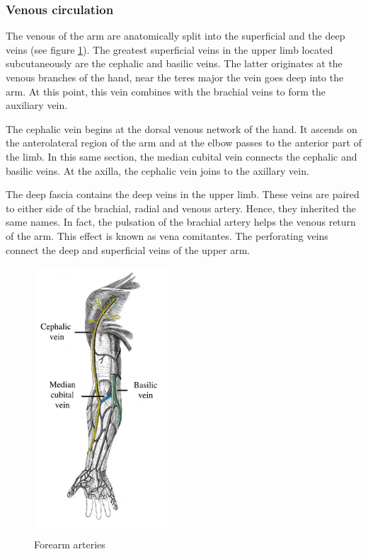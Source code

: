 \subsubsection{Venous circulation}
The venous of the arm are anatomically split into the superficial and the deep veins (see figure \ref{fig:arm veind}). The greatest superficial veins in the upper limb located subcutaneously are the cephalic and basilic veins. The latter originates at the venous branches of the hand, near the teres major the vein goes deep into the arm. At this point, this vein combines with the brachial veins to form the auxiliary vein. 

The cephalic vein begins at the dorsal venous network of the hand. It ascends on the anterolateral region of the arm and at the elbow passes to the anterior part of the limb. In this same section, the median cubital vein connects the cephalic and basilic veins. At the axilla, the cephalic vein joins to the axillary vein. 

The deep fascia contains the deep veins in the upper limb. These veins are paired to either side of the brachial, radial and venous artery. Hence, they inherited the same names.  In fact, the pulsation of the brachial artery helps the venous return of the arm. This effect is known as vena comitantes. The perforating veins connect the deep and superficial veins of the upper arm. 

\begin{figure}[!htpb]
	\centering
	\includegraphics[height=10cm,keepaspectratio]{figure21}
	\caption{Forearm arteries}
	\label{fig:arm veind}
\end{figure} 

